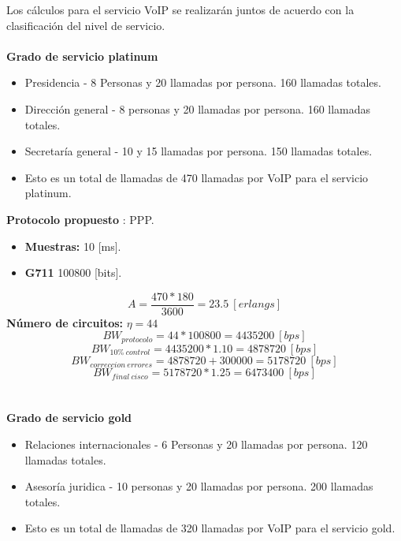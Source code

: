 \documentclass[12pt,letterpaper]{article}
\begin{document}
\newpage
Los cálculos para el servicio VoIP se realizarán juntos de acuerdo con la clasificación 
del nivel de servicio.
\\ \\
\textbf{Grado de servicio platinum}
\begin{itemize}
    \item Presidencia - 8 Personas y 20 llamadas por persona. 160 llamadas totales.
    \item Dirección general - 8 personas y 20 llamadas por persona. 160 llamadas totales.
    \item Secretaría general - 10 y 15 llamadas por persona. 150 llamadas totales.
    \item Esto es un total de llamadas de 470 llamadas por VoIP para el servicio platinum.
\end{itemize}
\textbf{Protocolo propuesto} : PPP.
\begin{itemize}
    \item \textbf{Muestras: }10 [ms].
    \item \textbf{G711} 100800 [bits].
\end{itemize}
\begin{equation}
    A=\frac{470 * 180}{3600}=23.5 \ [erlangs]
\end{equation}
\textbf{Número de circuitos: } $\eta = 44$
\newline
\begin{equation}
    BW_{protocolo}=44 * 100800 = 4435200 \ [bps]
\end{equation}
\begin{equation}
    BW_{10\% \ control}=4435200*1.10 = 4878720 \ [bps]
\end{equation}
\begin{equation}
    BW_{correccion \ errores}=4878720+300000 = 5178720 \ [bps]
\end{equation}
\begin{equation}
    BW_{final \ cisco}=5178720*1.25 = 6473400 \ [bps]
\end{equation}
\\ \\
\textbf{Grado de servicio gold}
\begin{itemize}
    \item Relaciones internacionales - 6 Personas y 20 llamadas por persona. 120 llamadas totales.
    \item Asesoría juridica - 10 personas y 20 llamadas por persona. 200 llamadas totales.
    \item Esto es un total de llamadas de 320 llamadas por VoIP para el servicio gold.
\end{itemize}
\end{document}
